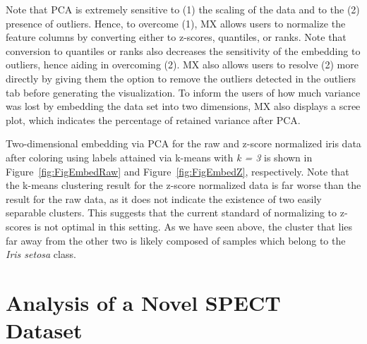 \documentclass[twoside,leqno,twocolumn]{article}
\begin{document}
Note that PCA is extremely sensitive to (1) the scaling of the data and to the (2) presence of outliers.  Hence, to overcome (1), MX allows users to normalize the feature columns by converting either to z-scores, quantiles, or ranks. Note that conversion to quantiles or ranks also decreases the sensitivity of the embedding to outliers, hence aiding in overcoming (2). MX also allows users to resolve (2) more directly by giving them the option to remove the outliers detected in the outliers tab before generating the visualization. To inform the users of how much variance was lost by embedding the data set into two dimensions, MX also displays a scree plot, which indicates the percentage of retained variance after PCA. 

Two-dimensional embedding via PCA for the raw  and z-score normalized iris data after coloring using labels attained via k-means with \textit{k = 3} is shown in Figure~\ref{fig:FigEmbedRaw} and Figure~\ref{fig:FigEmbedZ}, respectively. Note that the k-means clustering result for the z-score normalized data is far worse than the result for the raw data, as it does not indicate the existence of two easily separable clusters. This suggests that the current standard of normalizing to z-scores is not optimal in this setting. As we have seen above, the cluster that lies far away from the other two is likely composed of samples which belong to the \textit{Iris setosa} class.

\section{Analysis of a Novel SPECT Dataset}
\end{document}
